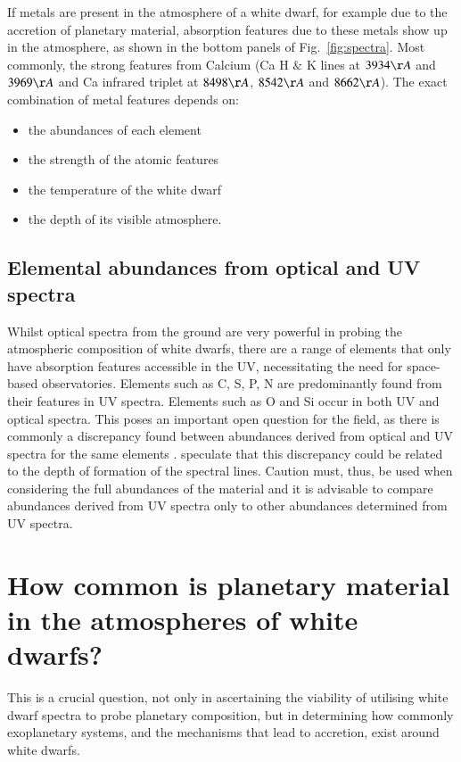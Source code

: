 \documentclass[onecolumn,authoryear]{els-mrw}
\newcommand\eg{{\it e.g.} }
\begin{document}
If metals are present in the atmosphere of a white dwarf, for example due to the accretion of planetary material, absorption features due to these metals show up in the atmosphere, as shown in the bottom panels of Fig.~\ref{fig:spectra}. Most commonly, the strong features from Calcium (Ca H $\&$ K lines at $3934\AA$ and $3969\AA$ and Ca infrared triplet at $8498\AA$, $8542\AA$ and $8662\AA$). The exact combination of metal features depends on: 
\begin{itemize}
    \item the abundances of each element
    \item the strength of the atomic features
    \item the temperature of the white dwarf 
    \item the depth of its visible atmosphere.  
\end{itemize}



\subsection{Elemental abundances from optical and UV spectra}
Whilst optical spectra from the ground are very powerful in probing the atmospheric composition of white dwarfs, there are a range of elements that only have absorption features accessible in the UV, necessitating the need for space-based observatories. Elements such as C, S, P, N are predominantly found from their features in UV spectra. Elements such as O and Si occur in both UV and optical spectra. This poses an important open question for the field, as there is commonly a discrepancy found between abundances derived from optical and UV spectra for the same elements \citep[\eg][]{Xu2019}. \cite{Rogers2024} speculate that this discrepancy could be related to the depth of formation of the spectral lines. Caution must, thus, be used when considering the full abundances of the material and it is advisable to compare abundances derived from UV spectra only to other abundances determined from UV spectra. 
    
    \section{How common is planetary material in the atmospheres of white dwarfs?}

This is a crucial question, not only in ascertaining the viability of utilising white dwarf spectra to probe planetary composition, but in determining how commonly exoplanetary systems, and the mechanisms that lead to accretion, exist around white dwarfs. 
\end{document}
